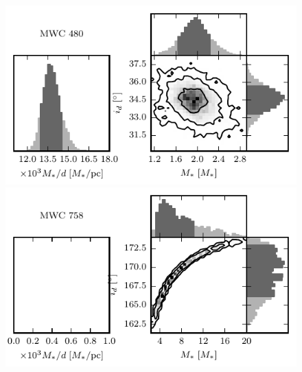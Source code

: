 \documentclass[twocolumn]{aastex6}
\begin{document}
\begin{figure}[htb]
\begin{center}
\includegraphics{MWC480_posterior.pdf}
\includegraphics{MWC758_posterior.pdf}
\end{center}
\end{figure}
\end{document}
